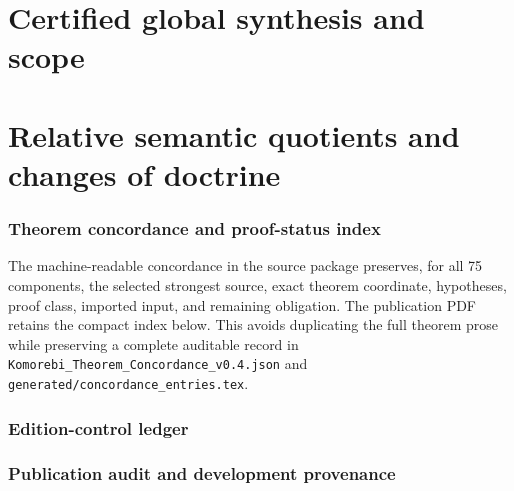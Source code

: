 \documentclass[11pt]{article}
\theoremstyle{definition}
\theoremstyle{remark}
\begin{document}








\part{Certified global synthesis and scope}







\part{Relative semantic quotients and changes of doctrine}










\appendix

\section{Theorem concordance and proof-status index}
\label{app:full-concordance}

The machine-readable concordance in the source package preserves, for all 75 components, the selected strongest source, exact theorem coordinate, hypotheses, proof class, imported input, and remaining obligation.  The publication PDF retains the compact index below.  This avoids duplicating the full theorem prose while preserving a complete auditable record in \nolinkurl{Komorebi_Theorem_Concordance_v0.4.json} and \nolinkurl{generated/concordance_entries.tex}.



\clearpage
\section{Edition-control ledger}


\clearpage
\section{Publication audit and development provenance}
\label{app:block15-publication-audit}
\end{document}

